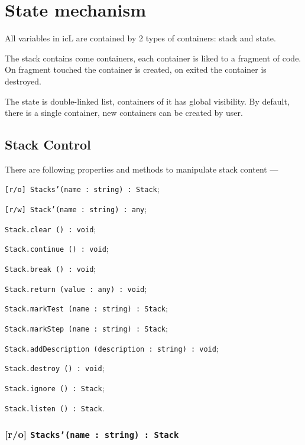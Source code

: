 \section{State mechanism}

All variables in icL are contained by 2 types of containers: stack and state.

The stack contains come containers, each container is liked to a fragment of code. On fragment touched the container is created, on exited the container is destroyed.

The state is double-linked list, containers of it has global visibility. By default, there is a single container, new containers can be created by user.

\subsection{Stack Control}
\label{stack:control}

There are following properties and methods to manipulate stack content —
\begin{icItems}
	\item \texttt{[r/o] Stacks'(name : string) : Stack};
	\item \texttt{[r/w] Stack'(name : string) : any};
	\item \texttt{Stack.clear () : void};
	\item \texttt{Stack.continue () : void};
	\item \texttt{Stack.break () : void};
	\item \texttt{Stack.return (value : any) : void};
	\item \texttt{Stack.markTest (name : string) : Stack};
	\item \texttt{Stack.markStep (name : string) : Stack};
	\item \texttt{Stack.addDescription (description : string) : void};
	\item \texttt{Stack.destroy () : void};
	\item \texttt{Stack.ignore () : Stack};
	\item \texttt{Stack.listen () : Stack}.
\end{icItems}

\subsubsection{[r/o] \texttt{Stacks'(name : string) : Stack}}

